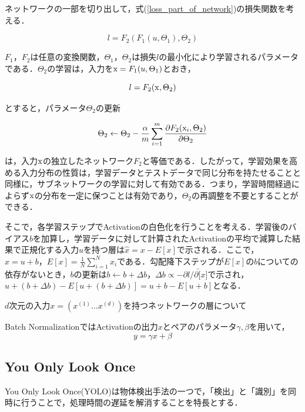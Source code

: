 \documentclass[11pt,a4paper]{jsarticle}
\begin{document}
ネットワークの一部を切り出して，式(\ref{loss_part_of_network})の損失関数を考える．

\begin{equation}
\label{loss_part_of_network}
	l = F_2(F_1(u, \Theta_1), \Theta_2)
\end{equation}

$F_1，F_2$は任意の変換関数，$\Theta_1，\Theta_2$は損失$l$の最小化により学習されるパラメータである．$\Theta_2$の学習は，入力を${\rm x} = F_1(u, \Theta_1)$とおき，

\begin{equation}
	l = F_2({\rm x}, \Theta_2)
\end{equation}

とすると，パラメータ$\Theta_2$の更新

\begin{equation}
	\Theta_2 \leftarrow \Theta_2 - \frac{\alpha}{m}\sum_{i=1}^{m}\frac{\partial F_2({\rm x}_i, \Theta_2)}{\partial \Theta_2}
\end{equation}

は，入力${\rm x}$の独立したネットワーク$F_2$と等価である．したがって，学習効果を高める入力分布の性質は，学習データとテストデータで同じ分布を持たせることと同様に，サブネットワークの学習に対して有効である．つまり，学習時間経過によらず${\rm x}$の分布を一定に保つことは有効であり，$\Theta_2$の再調整を不要とすることができる．

そこで，各学習ステップでActivationの白色化を行うことを考える．学習後のバイアス$b$を加算し，学習データに対して計算されたActivationの平均で減算した結果で正規化する入力$u$を持つ層は$\hat{x}=x-E[x]$で示される．ここで，$x=u+b，E[x]=\frac{1}{N}\sum_{i=1}^{N}x_i$である．勾配降下ステップが$E[x]$の$b$についての依存がないとき，$b$の更新は$b \leftarrow b+\Delta b$，$\Delta b \propto -\partial l / \partial \hat[x]$で示され，$u+(b+\Delta b)-E[u+(b+\Delta b)]=u+b-E[u+b]$となる．

$d$次元の入力$x=(x^(1) ... x^(d))$を持つネットワークの層について


Batch NormalizationではActivationの出力$x$とペアのパラメータ$\gamma, \beta$を用いて，
\begin{equation}
	y = \gamma x + \beta
\end{equation}

\subsection{You Only Look Once}
You Only Look Once(YOLO)は物体検出手法の一つで，「検出」と「識別」を同時に行うことで，処理時間の遅延を解消することを特長とする．
\end{document}
